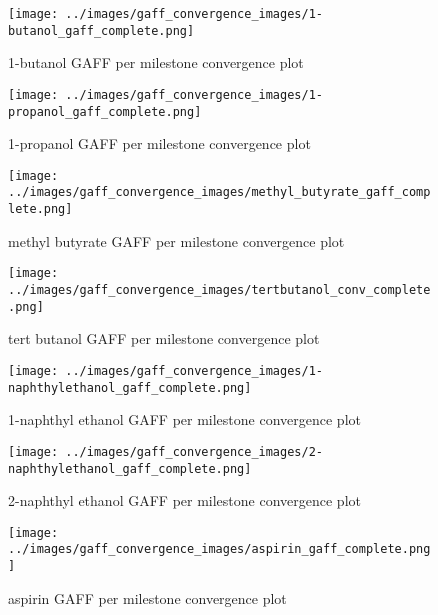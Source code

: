 
\begin{figure}
    \texttt{[image: ../images/gaff\_convergence\_images/1-butanol\_gaff\_complete.png]}
    \caption{1-butanol GAFF per milestone convergence plot}
    \label{fig:1-butanol_gaff_conv}
\end{figure}

\begin{figure}
    \texttt{[image: ../images/gaff\_convergence\_images/1-propanol\_gaff\_complete.png]}
    \caption{1-propanol GAFF per milestone convergence plot}
    \label{fig:1-propanol_gaff_conv}
\end{figure}

\begin{figure}
    \texttt{[image: ../images/gaff\_convergence\_images/methyl\_butyrate\_gaff\_complete.png]}
    \caption{methyl butyrate GAFF per milestone convergence plot}
    \label{fig:methyl_butyrate_gaff_conv}
\end{figure}

\begin{figure}
    \texttt{[image: ../images/gaff\_convergence\_images/tertbutanol\_conv\_complete.png]}
    \caption{tert butanol GAFF per milestone convergence plot}
    \label{fig:tert_butanol_gaff_conv}
\end{figure}

\begin{figure}
    \texttt{[image: ../images/gaff\_convergence\_images/1-naphthylethanol\_gaff\_complete.png]}
    \caption{1-naphthyl ethanol GAFF per milestone convergence plot}
    \label{fig:1-naphthylethanol_gaff_conv}
\end{figure}

\begin{figure}
    \texttt{[image: ../images/gaff\_convergence\_images/2-naphthylethanol\_gaff\_complete.png]}
    \caption{2-naphthyl ethanol GAFF per milestone convergence plot}
    \label{fig:2-naphthylethanol_gaff_conv}
\end{figure}

\begin{figure}
    \texttt{[image: ../images/gaff\_convergence\_images/aspirin\_gaff\_complete.png]}
    \caption{aspirin GAFF per milestone convergence plot}
    \label{fig:aspirin_conv}
\end{figure}







